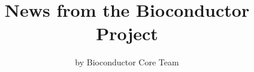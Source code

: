 \title{News from the Bioconductor Project}
\author{by Bioconductor Core Team}

\maketitle





\address{%
Bioconductor Core Team\\
\\%
\\
%
%
%
%
}
